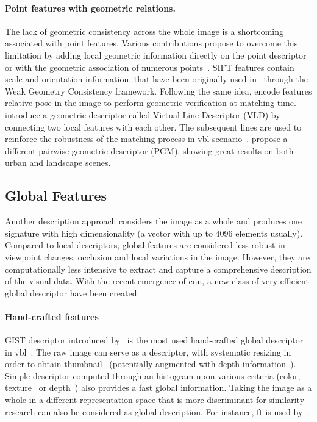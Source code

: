 		\paragraph{Point features with geometric relations.}
        	The lack of geometric consistency across the whole image is a shortcoming associated with point features. Various contributions propose to overcome this limitation by adding local geometric information directly on the point descriptor~\citep{Baatz2012,Jegou2008} or with the geometric association of numerous points~\citep{Liu2012,Li2015}. SIFT features contain scale and orientation information, that have been originally used in~\citep{Jegou2008} through the Weak Geometry Consistency framework. Following the same idea, \citet{Baatz2012} encode features relative pose in the image to perform geometric verification at matching time. \citet{Liu2012} introduce a geometric descriptor called Virtual Line Descriptor (VLD) by connecting two local features with each other. The subsequent lines are used to reinforce the robustness of the matching process in \ac{vbl} scenario~\citep{Majdik2013}. \citet{Li2015} propose a different pairwise geometric descriptor (PGM), showing great results on both urban and landscape scenes.
			
	\subsection{Global Features}
	\label{subsec:global_feature}
		Another description approach considers the image as a whole and produces one signature with high dimensionality (a vector with up to 4096 elements usually). Compared to local descriptors, global features are considered less robust in viewpoint changes, occlusion and local variations in the image. However, they are computationally less intensive to extract and capture a comprehensive description of the visual data. With the recent emergence of \ac{cnn}, a new class of very efficient global descriptor have been created.
		
		\paragraph{Hand-crafted features}
		 	GIST descriptor introduced by~\citet{Oliva2001} is the most used hand-crafted global descriptor in \ac{vbl}~\citep{Russell2011,Azzi2016,Hays2008}. The raw image can serve as a descriptor, with systematic resizing in order to obtain thumbnail~\citep{Hays2008,Corke2013} (potentially augmented with depth information~\citep{Gee2012}). Simple descriptor computed through an histogram upon various criteria (color, texture~\citep{Hays2008} or depth~\citep{Ni2009}) also provides a fast global information. Taking the image as a whole in a different representation space that is more discriminant for similarity research can also be considered as global description. For instance, \ac{ft} is used by~\citet{Wan2016}.
			
